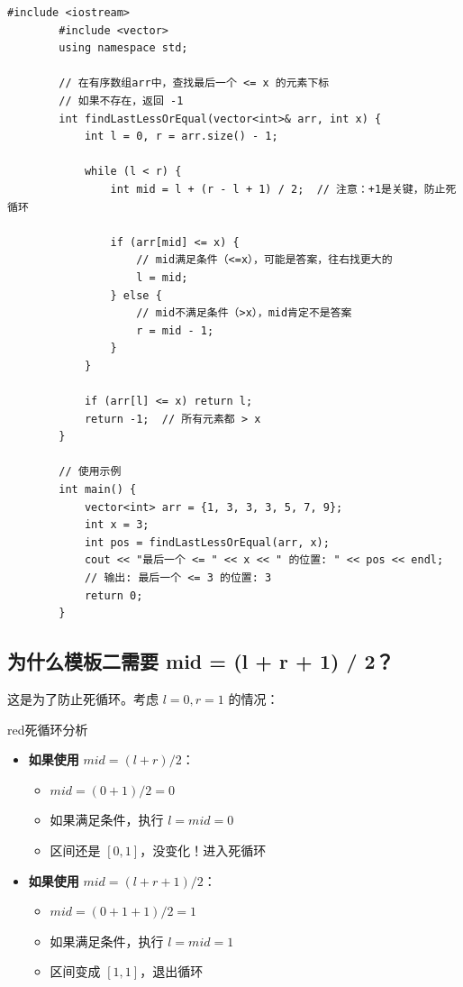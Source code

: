 \documentclass[12pt,a4paper]{article}
\begin{document}
	\begin{lstlisting}[caption={模板2：查找最后一个 <= x 的元素}]
		#include <iostream>
		#include <vector>
		using namespace std;
		
		// 在有序数组arr中，查找最后一个 <= x 的元素下标
		// 如果不存在，返回 -1
		int findLastLessOrEqual(vector<int>& arr, int x) {
			int l = 0, r = arr.size() - 1;
			
			while (l < r) {
				int mid = l + (r - l + 1) / 2;  // 注意：+1是关键，防止死循环
				
				if (arr[mid] <= x) {
					// mid满足条件（<=x），可能是答案，往右找更大的
					l = mid;
				} else {
					// mid不满足条件（>x），mid肯定不是答案
					r = mid - 1;
				}
			}
			
			if (arr[l] <= x) return l;
			return -1;  // 所有元素都 > x
		}
		
		// 使用示例
		int main() {
			vector<int> arr = {1, 3, 3, 3, 5, 7, 9};
			int x = 3;
			int pos = findLastLessOrEqual(arr, x);
			cout << "最后一个 <= " << x << " 的位置: " << pos << endl;
			// 输出: 最后一个 <= 3 的位置: 3
			return 0;
		}
	\end{lstlisting}
	
	\subsection{为什么模板二需要 mid = (l + r + 1) / 2？}
	
	这是为了防止死循环。考虑 $l = 0, r = 1$ 的情况：
	
	\begin{mybox}{red}{死循环分析}
		\begin{itemize}
			\item \textbf{如果使用} $mid = (l + r) / 2$：
			\begin{itemize}
				\item $mid = (0 + 1) / 2 = 0$
				\item 如果满足条件，执行 $l = mid = 0$
				\item 区间还是 $[0, 1]$，没变化！进入死循环
			\end{itemize}
			\item \textbf{如果使用} $mid = (l + r + 1) / 2$：
			\begin{itemize}
				\item $mid = (0 + 1 + 1) / 2 = 1$
				\item 如果满足条件，执行 $l = mid = 1$
				\item 区间变成 $[1, 1]$，退出循环
			\end{itemize}
		\end{itemize}
	\end{mybox}
	
\end{document}
